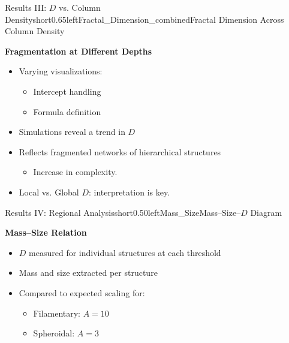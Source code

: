\documentclass[hyperref={pdfpagelabels=false}, aspectratio=169, t]{beamer}  %
\begin{document}
\begin{graphicsFrame}{Results III: \( D \) vs. Column Density}{short}{0.65}{left}{Fractal_Dimension_combined}{Fractal Dimension Across Column Density}

\textbf{Fragmentation at Different Depths}
\begin{itemize}
    \item Varying visualizations:
    \begin{itemize}
        \item Intercept handling
        \item Formula definition
    \end{itemize}

    \item Simulations reveal a trend in \( D \)
    \item Reflects fragmented networks of hierarchical structures 
    \begin{itemize}
		\item Increase in complexity.
	\end{itemize}
    \item Local vs. Global \( D \): interpretation is key.
\end{itemize}

\end{graphicsFrame}


\begin{graphicsFrame}{Results IV: Regional Analysis}{short}{0.50}{left}{Mass_Size}{Mass–Size–\( D \) Diagram}

\textbf{Mass–Size Relation}
\begin{itemize}
    \item \( D \) measured for individual structures at each threshold
    \item Mass and size extracted per structure
    \item Compared to expected scaling for:
    \begin{itemize}
        \item Filamentary: \( A = 10 \)
        \item Spheroidal: \( A = 3 \)
    \end{itemize}
\end{itemize}

\end{graphicsFrame}
\end{document}
